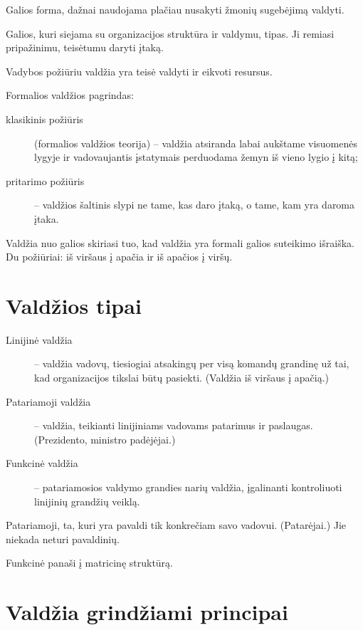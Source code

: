 \begin{defn}[Valdžia]
  Galios forma, dažnai naudojama plačiau nusakyti žmonių sugebėjimą
  valdyti.
\end{defn}

\begin{defn}
  Galios, kuri siejama su organizacijos struktūra ir valdymu, tipas.
  Ji remiasi pripažinimu, teisėtumu daryti įtaką.
\end{defn}

Vadybos požiūriu valdžia yra teisė valdyti ir eikvoti resursus.

Formalios valdžios pagrindas:
\begin{description}
  \item[klasikinis požiūris] (formalios valdžios teorija) – valdžia
    atsiranda labai aukštame visuomenės lygyje ir vadovaujantis
    įstatymais perduodama žemyn iš vieno lygio į kitą;
  \item[pritarimo požiūris] – valdžios šaltinis slypi ne tame, kas
    daro įtaką, o tame, kam yra daroma įtaka.
\end{description}

Valdžia nuo galios skiriasi tuo, kad valdžia yra formali galios suteikimo
išraiška. Du požiūriai: iš viršaus į apačia ir iš apačios į viršų.

\section{Valdžios tipai}

\begin{description}
  \item[Linijinė valdžia] – valdžia vadovų, tiesiogiai atsakingų per
    visą komandų grandinę už tai, kad organizacijos tikslai būtų pasiekti.
    (Valdžia iš viršaus į apačią.)
  \item[Patariamoji valdžia] – valdžia, teikianti linijiniams vadovams
    patarimus ir paslaugas. (Prezidento, ministro padėjėjai.)
  \item[Funkcinė valdžia] – patariamosios valdymo grandies narių valdžia,
    įgalinanti kontroliuoti linijinių grandžių veiklą.
\end{description}

Patariamoji, ta, kuri yra pavaldi tik konkrečiam savo vadovui. 
(Patarėjai.) Jie niekada neturi pavaldinių.

Funkcinė panaši į matricinę struktūrą.

\section{Valdžia grindžiami principai}

